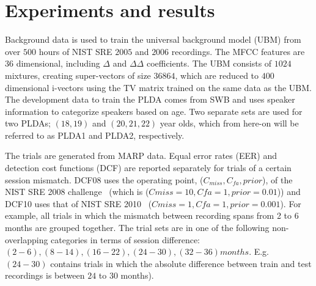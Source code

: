 \documentclass[a4paper]{article}
\begin{document}
 

\section{Experiments and results}
\label{sec:expAndresults}
Background data is used to train the universal background model (UBM) from over $500$ hours of NIST SRE $2005$ and $2006$ recordings. The MFCC features are 36 dimensional, including $\Delta$ and $\Delta\Delta$ coefficients. The UBM consists of $1024$ mixtures, creating super-vectors of size $36864$, which are reduced to $400$ dimensional i-vectors using the TV matrix trained on the same data as the UBM. The development data to train the PLDA comes from SWB and uses speaker information to categorize speakers based on age. Two separate sets are used for two PLDAs; $(18,19)$ and $(20,21,22)$ year olds, which from here-on will be referred to as PLDA1 and PLDA2, respectively.

The trials are generated from MARP data. Equal error rates (EER) and detection cost functions (DCF) are reported separately for trials of a certain session mismatch. DCF08 uses the operating point, ($C_{miss},C_{fa},prior$), of the NIST SRE 2008 challenge~\cite{NIST08} (which is ($Cmiss = 10, Cfa = 1, prior = 0.01$)) and DCF10 uses that of NIST SRE 2010~\cite{NIST10} ($Cmiss = 1, Cfa = 1, prior = 0.001$). For example, all trials in which the mismatch between recording spans from 2 to 6 months are grouped together. The trial sets are in one of the following non-overlapping categories in terms of session difference: $(2-6),(8-14),(16-22),(24-30),(32-36) months$. E.g. $(24-30)$ contains trials in which the absolute difference between train and test recordings is between $24$ to $30$ months). 
\end{document}
